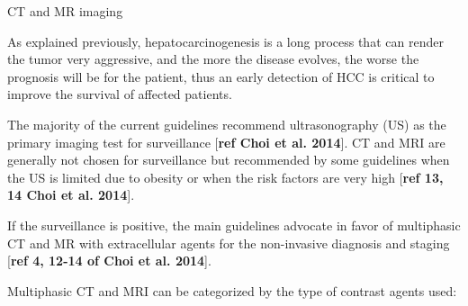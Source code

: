 \documentclass[]{article}
\begin{document}
\protect\hypertarget{anchor-8}{}{}CT and MR imaging

As explained previously, hepatocarcinogenesis is a long process that can
render the tumor very aggressive, and the more the disease evolves, the
worse the prognosis will be for the patient, thus an early detection of
HCC is critical to improve the survival of affected patients.

The majority of the current guidelines recommend ultrasonography (US) as
the primary imaging test for surveillance {[}\textbf{ref Choi et al.
2014}{]}. CT and MRI are generally not chosen for surveillance but
recommended by some guidelines when the US is limited due to obesity or
when the risk factors are very high {[}\textbf{ref 13, 14 Choi et al.
2014}{]}.

If the surveillance is positive, the main guidelines advocate in favor
of multiphasic CT and MR with extracellular agents for the non-invasive
diagnosis and staging {[}\textbf{ref 4, 12-14 of Choi et al. 2014}{]}.

Multiphasic CT and MRI can be categorized by the type of contrast agents
used:
\end{document}
